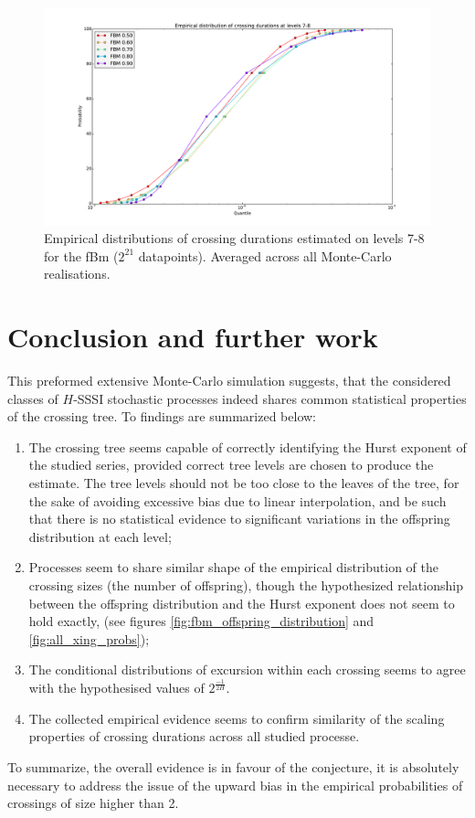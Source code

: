 \documentclass[a4paper]{article}
\begin{document}
\begin{figure}[htb]\begin{center}
    \includegraphics[width=6in]{images/fig_10_med_FBM}
    \caption{Empirical distributions of crossing durations estimated on levels 7-8
    for the fBm ($2^{21}$ datapoints). Averaged across all Monte-Carlo realisations.}
\label{fig:fbm_quantiles_durations}
\end{center}\end{figure}



\section{Conclusion and further work} %
\label{sec:conlusion_and_further_work}

This preformed extensive Monte-Carlo simulation suggests, that the considered
classes of $H$-SSSI stochastic processes indeed shares common statistical properties
of the crossing tree. To findings are summarized below: \begin{enumerate}
	\item The crossing tree seems capable of correctly identifying the Hurst
	exponent of the studied series, provided correct tree levels are chosen to
	produce the estimate. The tree levels should not be too close to the leaves
	of the tree, for the sake of avoiding excessive bias due to linear interpolation,
	and be such that there is no statistical evidence to significant variations
	in the offspring distribution at each level;
	\item Processes seem to share similar shape of the empirical distribution of
	the crossing sizes (the number of offspring), though the hypothesized
	relationship between the offspring distribution and the Hurst exponent
	does not seem to hold exactly, (see figures \ref{fig:fbm_offspring_distribution}
	and \ref{fig:all_xing_probs});
	\item The conditional distributions of excursion within each crossing seems
	to agree with the hypothesised values of $2^{\frac{-1}{2H}}$.
	\item The collected empirical evidence seems to confirm similarity of the scaling
	properties of crossing durations across all studied processe.
\end{enumerate}
To summarize, the overall evidence is in favour of the conjecture, it is absolutely
necessary to address the issue of the upward bias in the empirical probabilities of
crossings of size higher than 2.
\end{document}
